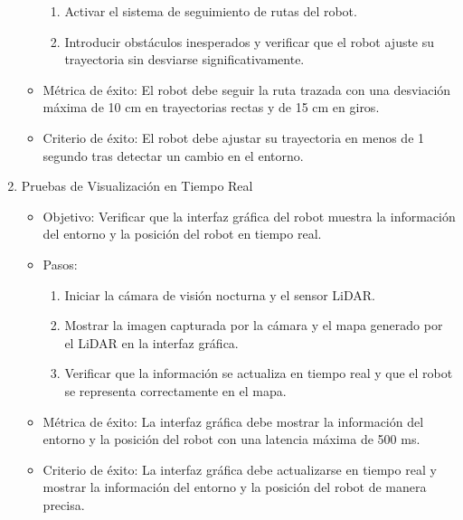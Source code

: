 \begin{enumerate}
\begin{itemize}
\begin{enumerate}
                    \item Activar el sistema de seguimiento de rutas del robot.
                    \item Introducir obst\'aculos inesperados y verificar que el robot ajuste
                        su trayectoria sin desviarse significativamente.
                \end{enumerate}
            \item M\'etrica de \'exito: El robot debe seguir la ruta trazada con una desviaci\'on
                m\'axima de 10 cm en trayectorias rectas y de 15 cm en giros.
            \item Criterio de \'exito: El robot debe ajustar su trayectoria en menos de 1
                segundo tras detectar un cambio en el entorno.
        \end{itemize}
        \item Pruebas de Visualizaci\'on en Tiempo Real
        \begin{itemize}
            \item Objetivo: Verificar que la interfaz gr\'afica del robot muestra la
                informaci\'on del entorno y la posici\'on del robot en tiempo real.
            \item Pasos:
                \begin{enumerate}
                    \item Iniciar la c\'amara de visi\'on nocturna y el sensor LiDAR.
                    \item Mostrar la imagen capturada por la c\'amara y el mapa generado por
                        el LiDAR en la interfaz gr\'afica.
                    \item Verificar que la informaci\'on se actualiza en tiempo real y que el
                        robot se representa correctamente en el mapa.
                \end{enumerate}
            \item M\'etrica de \'exito: La interfaz gr\'afica debe mostrar la informaci\'on del
                entorno y la posici\'on del robot con una latencia m\'axima de 500 ms.
            \item Criterio de \'exito: La interfaz gr\'afica debe actualizarse en tiempo real y
                mostrar la informaci\'on del entorno y la posici\'on del robot de manera precisa.
        \end{itemize}
    \end{enumerate}